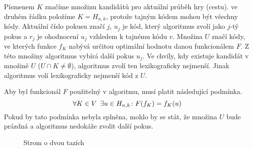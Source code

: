 Písmenem $K$ značíme množinu kandidátů pro aktuální průběh hry (cestu). ve druhém řádku položíme $K = H_{n,k}$, protože tajným kódem mohou být všechny kódy. Aktuální číslo pokusu značí $j$, $u_j$ je kód, který algoritmus zvolí jako $j$-tý pokus a $r_j$ je ohodnocení $u_j$ vzhledem k tajnému kódu $v$. Množina $U$ značí kódy, ve kterých funkce $f_K$ nabývá určitou optimální hodnotu danou funkcionálem $F$. Z této množiny algoritmus vybírá další pokus $u_j$. Ve chvíly, kdy existuje kandidát v množině $U$ ($U\cap K \neq \emptyset$), algoritmus zvolí ten lexikograficky nejmenší. Jinak algoritmus volí lexikograficky nejmenší kód z $U$. 

Aby byl funkcionál $F$ použitelný v algoritmu, musí platit následující podmínka. 
\[\forall K \in V \hspace{5px} \exists u \in H_{n,k} \colon F(f_K) = f_K(u)\]
Pokud by tato podmínka nebyla splněna, mohlo by se stát, že množina $U$ bude prázdná a algoritmus nedokáže zvolit další pokus.





\begin{figure}[h!]
    \centering
    \caption{Strom o dvou tazích}
    \label{figcandidatetree}
    \end{figure}



